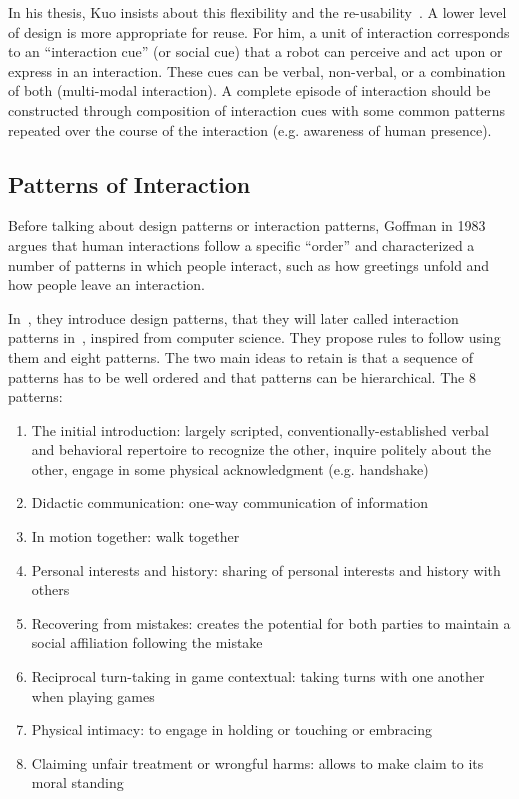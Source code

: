 \documentclass[a4paper,11pt,twoside]{StyleThese}
\begin{document}
In his thesis, Kuo insists about this flexibility and the re-usability~\cite{kuo_2012_designing}. A lower level of design is more appropriate for reuse. For him, a unit of interaction corresponds to an ``interaction cue'' (or social cue) that a robot can perceive and act upon or express in an interaction. These cues can be verbal, non-verbal, or a combination of both (multi-modal interaction). A complete episode of interaction should be constructed through composition of interaction cues with some common patterns repeated over the course of the interaction (e.g. awareness of human presence).

\subsection{Patterns of Interaction}
Before talking about design patterns or interaction patterns, Goffman in 1983~\cite{goffman_1983_interaction} argues that human interactions follow a specific ``order'' and characterized a number of patterns in which people interact, such as how greetings unfold and how people leave an interaction.

In~\cite{kahn_2008_design}, they introduce design patterns, that they will later called interaction patterns in~\cite{kahn_2010_validating}, inspired from computer science. They propose rules to follow using them and eight patterns. The two main ideas to retain is that a sequence of patterns has to be well ordered and that patterns can be hierarchical. 
The 8 patterns: 
\begin{enumerate}
	\item The initial introduction: largely scripted, conventionally-established verbal and behavioral repertoire to recognize the other, inquire politely about the other, engage in some physical acknowledgment (e.g. handshake)
	\item Didactic communication: one-way communication of information 
	\item In motion together: walk together
	\item Personal interests and history: sharing of personal interests and history with others
	\item Recovering from mistakes: creates the potential for both parties to maintain a social affiliation following the mistake
	\item Reciprocal turn-taking in game contextual: taking turns with one another when playing games
	\item Physical intimacy: to engage in holding or touching or embracing
	\item Claiming unfair treatment or wrongful harms: allows to make claim to its moral standing
\end{enumerate}
\end{document}

